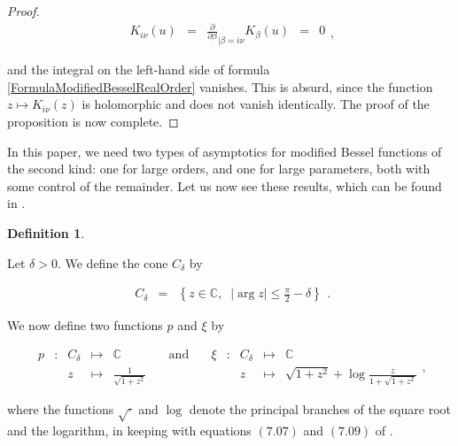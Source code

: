 \documentclass{jams-l}
\theoremstyle{definition}
\newtheorem{definition}[theorem]{Definition}
\theoremstyle{remark}
\numberwithin{equation}{section}
\begin{document}
\begin{proof}
            \[ \begin{array}{lllll}
                    K_{i \nu} \left( u \right) & = & \frac{\partial}{\partial \beta}_{\vert \beta = i \nu} K_{\beta} \left( u \right) & = & 0
                \end{array} , \]
            
            \noindent and the integral on the left-hand side of formula \ref{FormulaModifiedBesselRealOrder} vanishes. This is absurd, since the function $z \longmapsto K_{i \nu} \left( z \right)$ is holomorphic and does not vanish identically. The proof of the proposition is now complete.
        
        \end{proof}
        
        In this paper, we need two types of asymptotics for modified Bessel functions of the second kind: one for large orders, and one for large parameters, both with some control of the remainder. Let us now see these results, which can be found in \cite{MR1429619}.
        
        \begin{definition}
        \label{Defpxi}
        
            Let $\delta > 0$. We define the cone $C_{\delta}$ by
            
            \[ \begin{array}{lll}
                    C_{\delta} & = & \left \{ z \in \mathbb{C}, \; \; \left \vert \arg z \right \vert \leqslant \frac{\pi}{2} - \delta \right \}
                \end{array} . \]
            
            \noindent We now define two functions $p$ and $\xi$ by
            
            \[ \begin{array}{cccclcccccl}
                    p & : & C_{\delta} & \longmapsto & \mathbb{C} & \quad \text{and} \quad & \xi & : & C_{\delta} & \longmapsto & \mathbb{C} \\
                    && z & \longmapsto & \frac{1}{\sqrt{1 + z^2}} & & && z & \longmapsto & \sqrt{1 + z^2} + \log \frac{z}{1 + \sqrt{1 + z^2}}
                \end{array} , \]
            
            \noindent where the functions $\sqrt{\cdot}$ and $\log$ denote the principal branches of the square root and the logarithm, in keeping with equations $\left( 7.07 \right)$ and $\left( 7.09 \right)$ of \cite[Sec. 10.7.3]{MR1429619}.
        
        \end{definition}
        
\end{document}
